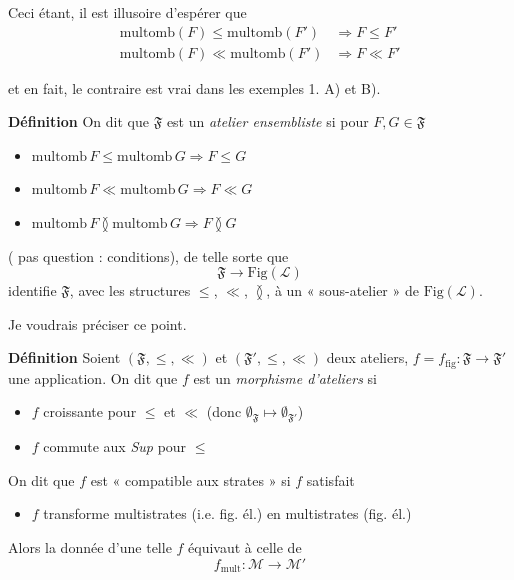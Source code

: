 \documentclass[11pt,a4paper]{article}
\begin{document}
Ceci étant, il est  illusoire d'espérer que
\[
  \begin{aligned}
    \mathrm{multomb}(F) \leq \mathrm{multomb}(F') &\Longrightarrow F \leq F' \\
    \mathrm{multomb}(F) \ll \mathrm{multomb}(F') &\Longrightarrow F \ll F'
  \end{aligned}
\]

et en fait, le contraire est vrai dans les exemples 1. A) et B).

\textbf{Définition} On dit que $\mathfrak{F}$ est un \emph{atelier ensembliste} si pour $F, G \in \mathfrak{F}$
\begin{itemize}
  \item[a)] $\mathrm{multomb}\, F \leq \mathrm{multomb}\, G \Longrightarrow F \leq G$
  \item[b)] $\mathrm{multomb}\, F \ll \mathrm{multomb}\, G \Longrightarrow F \ll G$
  \item[c)] $\mathrm{multomb}\, F \between \mathrm{multomb}\, G \Longrightarrow F \between G$
\end{itemize}
 (\ill{} pas \ill{} question \ill{} : \ill{} conditions), de telle sorte que
\[
  \mathfrak{F} \longrightarrow \mathrm{Fig}(\mathcal{L})
\]
identifie $\mathfrak{F}$, avec les structures $\leq$, $\ll$, $\between$, à un « sous-atelier » de $\mathrm{Fig}(\mathcal{L})$.


\struck{\ill{}} Je voudrais préciser ce point. 

\textbf{Définition} Soient $(\mathfrak{F}, \leq, \ll)$ et $(\mathfrak{F}', \leq, \ll)$ deux ateliers, $f = f_{\mathrm{fig}} : \mathfrak{F} \to \mathfrak{F}'$ une application. On dit que $f$ est un \emph{morphisme d'ateliers} si
\begin{itemize}
  \item[a)] $f$ croissante pour $\leq$ et $\ll$ (donc $\emptyset_{\mathfrak{F}} \mapsto \emptyset_{\mathfrak{F}'}$)
  \item[b)]  $f$ commute aux \emph{Sup} \ill{} pour $\leq$  
\end{itemize}
 On dit que $f$ est « compatible aux strates » si  $f$ satisfait
\begin{itemize}
  \item[c)] $f$ transforme multistrates (i.e. fig. él.) en multistrates (fig. él.)
\end{itemize}
Alors la donnée d'une telle $f$ équivaut à celle de
\[
  f_{\mathrm{mult}} : \mathcal{M} \longrightarrow \mathcal{M}'
\]
\end{document}
